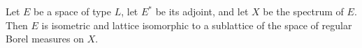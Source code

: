 Let $E$ be a space of type $L$, let $E^*$ be its adjoint, and let $X$ be the spectrum of $E$. Then $E$ is isometric and lattice isomorphic to a sublattice of the space of regular Borel measures on $X$.
